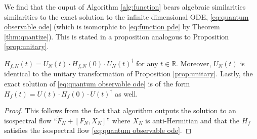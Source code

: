 \documentclass[final,leqno]{siamart}
\DeclareMathOperator{\OdeSolve}{OdeSolve}
\begin{document}
We find that the ouput of Algorithm \ref{alg:function} bears algebraic similarities similarities to the exact solution to the infinite dimensional ODE, \eqref{eq:quantum observable ode} (which is isomorphic to \eqref{eq:function pde} by Theorem \ref{thm:quantize}).
This is stated in a proposition analogous to Proposition \ref{prop:unitary}.

\begin{proposition} \label{prop:isospectral}
$H_{f,N}(t) = U_{N}(t) \cdot H_{f,N}(0) \cdot U_{N}(t)^{\dagger}$ for any $t \in \mathbb{R}$.
Moreover, $U_{N}(t)$ is identical to the unitary transformation of Proposition \ref{prop:unitary}.
Lastly, the exact solution of \eqref{eq:quantum observable ode} is of the form $H_{f}(t) = U(t) \cdot H_{f}(0)  \cdot U(t)^{\dagger}$ as well.
\end{proposition}
\begin{proof}
	This follows from the fact that algorithm outputs the solution to an isospectral flow ``$\dot{F}_{N} + [F_{N} , X_{N}]$''
	where $X_{N}$ is anti-Hermitian and that the $H_{f}$ satisfies the isospectral flow \eqref{eq:quantum observable ode}.
\end{proof}

%
%
\end{document}
